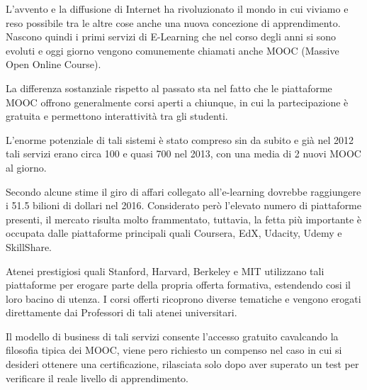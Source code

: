 L'avvento e la diffusione di Internet ha rivoluzionato il mondo in cui viviamo e reso possibile tra le altre cose anche una nuova concezione di apprendimento. Nascono quindi i primi servizi di E-Learning che nel corso degli anni si sono evoluti e oggi giorno vengono comunemente chiamati anche MOOC (Massive Open Online Course).

La differenza sostanziale rispetto al passato sta nel fatto che le piattaforme MOOC offrono generalmente corsi aperti a chiunque, in cui la partecipazione è gratuita e permettono interattività tra gli studenti.

L'enorme potenziale di tali sistemi è stato compreso sin da subito e già nel 2012 tali servizi erano circa 100 e quasi 700 nel 2013, con una media di 2 nuovi MOOC al giorno.


Secondo alcune stime il giro di affari collegato all'e-learning dovrebbe raggiungere i 51.5 bilioni di dollari nel 2016\cite{trends2014forecast}. Considerato però l'elevato numero di piattaforme presenti, il mercato risulta molto frammentato, tuttavia, la fetta più importante è occupata dalle piattaforme principali quali Coursera, EdX, Udacity, Udemy e SkillShare.




Atenei prestigiosi quali Stanford, Harvard, Berkeley e MIT utilizzano tali piattaforme per erogare parte della propria offerta formativa, estendendo cosi il loro bacino di utenza.
I corsi offerti ricoprono diverse tematiche e vengono erogati direttamente dai Professori di tali atenei universitari.

Il modello di business di tali servizi consente l'accesso gratuito cavalcando la filosofia tipica dei MOOC, viene pero richiesto un compenso nel caso in cui si desideri ottenere una certificazione, rilasciata solo dopo aver superato un test per verificare il reale livello di apprendimento.

